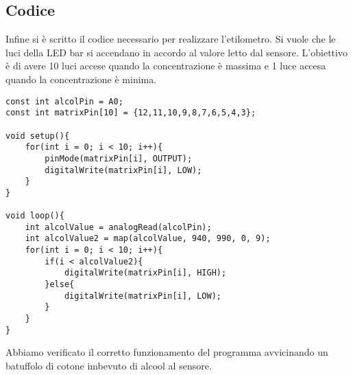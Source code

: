 \subsection{Codice}
Infine si è scritto il codice necessario per realizzare l’etilometro. Si vuole che le luci della LED bar si accendano in accordo al valore letto dal sensore. L’obiettivo è di avere 10 luci accese quando la concentrazione è massima e 1 luce accesa quando la concentrazione è minima.
\begin{lstlisting}[frame=single, language=Arduino]
const int alcolPin = A0;
const int matrixPin[10] = {12,11,10,9,8,7,6,5,4,3};

void setup(){
    for(int i = 0; i < 10; i++){
        pinMode(matrixPin[i], OUTPUT);
        digitalWrite(matrixPin[i], LOW);
    }
}

void loop(){
    int alcolValue = analogRead(alcolPin);
    int alcolValue2 = map(alcolValue, 940, 990, 0, 9);
    for(int i = 0; i < 10; i++){
        if(i < alcolValue2){
            digitalWrite(matrixPin[i], HIGH);
        }else{
            digitalWrite(matrixPin[i], LOW);
        }
    }
}
\end{lstlisting}
Abbiamo verificato il corretto funzionamento del programma avvicinando un batuffolo di cotone imbevuto di alcool al sensore.